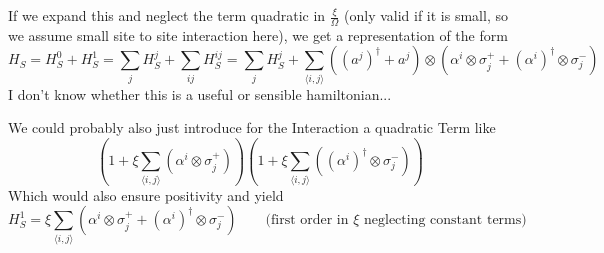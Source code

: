 	If we expand this and neglect the term quadratic in $\frac{\xi}{\Omega}$ (only valid if it is small, so we assume small site to site interaction here), we get a representation of the form
	\begin{equation}
		H_S =	H_S^0 + H_S^1 =	\sum_j H_S^j + \sum_{ij} H_S^{ij} =		\sum_j H_S^j + \sum_{\langle i, j \rangle } \left( (a^j)^\dagger + a^j \right) \otimes \left( \alpha^i \otimes \sigma_j^+ + (\alpha^i)^\dagger \otimes \sigma_j^-\right)
	\end{equation}
	I don't know whether this is a useful or sensible hamiltonian...
	
	We could probably also just introduce for the Interaction a quadratic Term like
	\begin{equation}
		\left(1  +  \xi \sum_{\langle i, j \rangle}^{} \left( \alpha^i \otimes \sigma_j^+ \right) \right) \left(1 + \xi \sum_{\langle i, j \rangle}^{} \left( (\alpha^i)^\dagger \otimes \sigma_j^- \right) \right)
	\end{equation}
	Which would also ensure positivity and yield
	\begin{equation}
		H_S^1 =	\xi \sum_{\langle i, j \rangle}^{} \left( \alpha^i \otimes \sigma_j^+ + (\alpha^i)^\dagger \otimes \sigma_j^-\right) \qquad \text{(first order in $\xi$ neglecting constant terms)}
	\end{equation}
	
